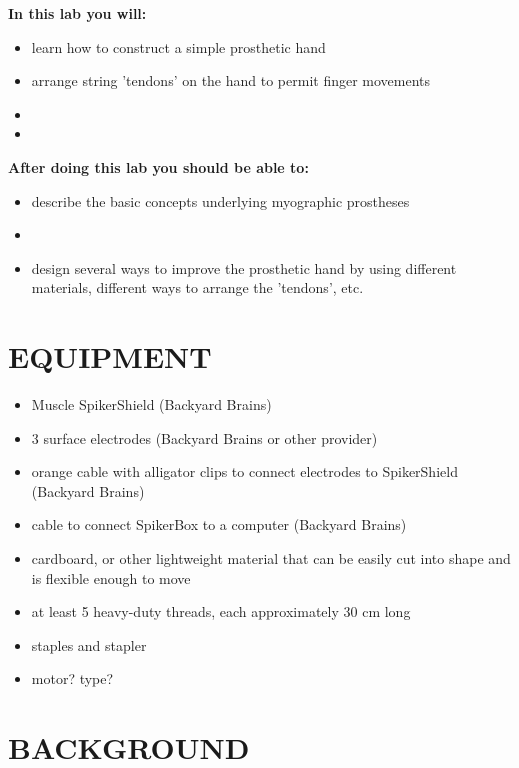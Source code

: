 \documentclass[12pt]{article}
\begin{document}
\vspace{0.3cm}

\textbf{In this lab you will:}
\begin{itemize}
\item learn how to construct a simple prosthetic hand
\item arrange string 'tendons' on the hand to permit finger movements
\item 
\item 
\end{itemize}

\vspace{0.3cm}
 
\textbf{After doing this lab you should be able to:}
\begin{itemize}
\item describe the basic concepts underlying myographic prostheses
\item 
\item design several ways to improve the prosthetic hand by using different materials, different ways to arrange the 'tendons', etc.
\end{itemize}

\section*{EQUIPMENT}

 \begin{itemize}
	\item Muscle SpikerShield (Backyard Brains)
    \item 3 surface electrodes (Backyard Brains or other provider)
    \item orange cable with alligator clips to connect electrodes to SpikerShield (Backyard Brains)
    \item cable to connect SpikerBox to a computer (Backyard Brains)
 	\item cardboard, or other lightweight material that can be easily cut into shape and is flexible enough to move
 	\item at least 5 heavy-duty threads, each approximately 30 cm long 
 	\item staples and stapler
 	\item motor? type?
\end{itemize}

\section*{BACKGROUND}
\end{document}
